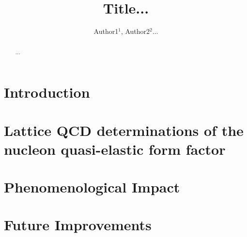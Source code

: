 \documentclass{ar-1col}
\begin{document}

\title{Title...}

\author{Author1$^1$, Author2$^2$...
}

\begin{abstract}
  ...
\end{abstract}

\begin{keywords}
\end{keywords}

\maketitle

\tableofcontents


\section{Introduction\label{sec:intro}}



\section{Lattice QCD determinations of the nucleon quasi-elastic form factor\label{sec:intro}}



\section{Phenomenological Impact\label{sec:impact}}



\section{Future Improvements\label{sec:future}}



\end{document}
